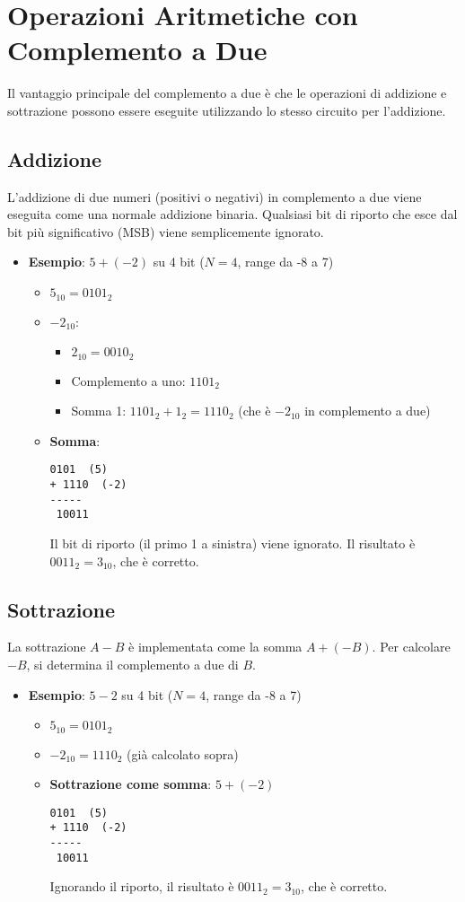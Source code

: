 \section{Operazioni Aritmetiche con Complemento a Due}
Il vantaggio principale del complemento a due è che le operazioni di addizione e sottrazione possono essere eseguite utilizzando lo stesso circuito per l'addizione.

\subsection{Addizione}
L'addizione di due numeri (positivi o negativi) in complemento a due viene eseguita come una normale addizione binaria. Qualsiasi bit di riporto che esce dal bit più significativo (MSB) viene semplicemente ignorato.
\begin{itemize}
    \item \textbf{Esempio}: $5 + (-2)$ su 4 bit ($N=4$, range da -8 a 7)
    \begin{itemize}
        \item $5_{10} = 0101_2$
        \item $-2_{10}$:
        \begin{itemize}
            \item $2_{10} = 0010_2$
            \item Complemento a uno: $1101_2$
            \item Somma 1: $1101_2 + 1_2 = 1110_2$ (che è $-2_{10}$ in complemento a due)
        \end{itemize}
        \item \textbf{Somma}:
        \begin{lstlisting}[language=Pseudocode]
  0101  (5)
+ 1110  (-2)
-----
 10011
        \end{lstlisting}
        Il bit di riporto (il primo 1 a sinistra) viene ignorato. Il risultato è $0011_2 = 3_{10}$, che è corretto.
    \end{itemize}
\end{itemize}

\subsection{Sottrazione}
La sottrazione $A - B$ è implementata come la somma $A + (-B)$. Per calcolare $-B$, si determina il complemento a due di $B$.
\begin{itemize}
    \item \textbf{Esempio}: $5 - 2$ su 4 bit ($N=4$, range da -8 a 7)
    \begin{itemize}
        \item $5_{10} = 0101_2$
        \item $-2_{10} = 1110_2$ (già calcolato sopra)
        \item \textbf{Sottrazione come somma}: $5 + (-2)$
        \begin{lstlisting}[language=Pseudocode]
  0101  (5)
+ 1110  (-2)
-----
 10011
        \end{lstlisting}
        Ignorando il riporto, il risultato è $0011_2 = 3_{10}$, che è corretto.
    \end{itemize}
\end{itemize}

